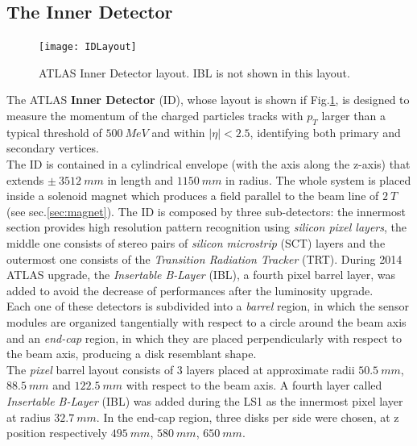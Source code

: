\documentclass[a4paper,twoside,12pt]{article}
\begin{document}
\subsection{The Inner Detector}

\begin{figure} [h]
	\texttt{[image: IDLayout]}
	\caption{ATLAS Inner Detector layout\cite{Aad:2008zzm}. IBL is not shown in this layout.}
	\label{fig:IDLayout}
\end{figure}

The ATLAS \textbf{Inner Detector} (ID), whose layout is shown if Fig.\ref{fig:IDLayout}, is designed to measure the momentum of the
charged particles tracks with $p_{T}$ larger than a typical threshold of $500\ MeV$ and 
within $|\eta| < 2.5$, identifying both primary and secondary vertices\cite{Aad:2008zzm}. \\

The ID is contained in a cylindrical envelope (with the axis along the z-axis) that extends
$\pm\ 3512\ mm$ in length and $1150\ mm$ in radius. The whole system is placed inside
a solenoid magnet which produces a field parallel to the beam line of $2\ T$(see sec.\ref{sec:magnet}). The ID is composed by three sub-detectors: the innermost section provides
high resolution pattern recognition using \textit{silicon pixel layers}, the middle one consists of stereo pairs of \textit{silicon microstrip} (SCT) layers and the outermost one consists of the \textit{Transition Radiation Tracker} (TRT). During 2014 ATLAS upgrade, the \textit{Insertable B-Layer} (IBL), a fourth pixel barrel layer, was added to avoid the decrease of performances after the luminosity upgrade. \\

Each one of these detectors is subdivided into a \textit{barrel} region, in which the sensor modules 
are organized tangentially with respect to a circle around the beam axis and an \textit{end-cap} region, in which they are placed perpendicularly with respect to the beam axis, producing
a disk resemblant shape.\\

The \textit{pixel} barrel layout consists of 3 layers placed at approximate radii $50.5\ mm$, $88.5\ mm$ and $122.5\ mm$ with respect to the beam 
axis. A fourth layer called \textit{Insertable B-Layer} (IBL) was added during the LS1 as the
innermost pixel layer at radius $32.7\ mm$. In the end-cap region, three disks per side were chosen,
at z position respectively $495\ mm$, $580\ mm$, $650\ mm$. \\
\end{document}
